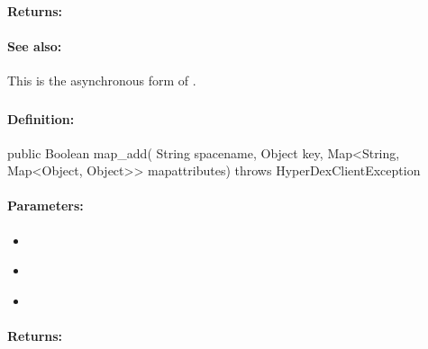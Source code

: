 \paragraph{Returns:}


\paragraph{See also:}  This is the asynchronous form of .

\pagebreak
\subsubsection{}
\label{api:java:map_add}


\paragraph{Definition:}
\begin{javacode}
public Boolean map_add(
        String spacename,
        Object key,
        Map<String, Map<Object, Object>> mapattributes) throws HyperDexClientException
\end{javacode}

\paragraph{Parameters:}
\begin{itemize}[noitemsep]
\item {}\\

\item {}\\

\item {}\\

\end{itemize}

\paragraph{Returns:}


